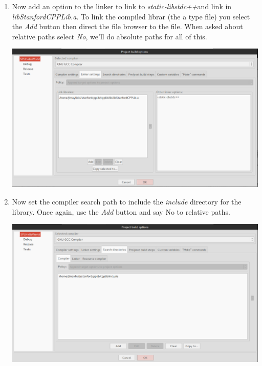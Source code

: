 \documentclass[10pt]{article}
\begin{document}
\begin{enumerate}
\item Now add an option to the linker to link to \textit{static-libstdc++}and link in \textit{libStanfordCPPLib.a}.  To link the compiled librar (the a type file) you select the \textit{Add} button then direct the file browser to the file.  When asked about relative paths select \textit{No}, we'll do absolute paths for all of this.

\vspace{.1in}
\begin{center}
\includegraphics[scale=.35]{scpplib-linker.png}
\end{center}
\vspace{.1in}

\item Now set the compiler search path to include the \textit{include} directory for the library. Once again, use the \textit{Add} button and say No to relative paths.

\vspace{.1in}
\begin{center}
\includegraphics[scale=.35]{scpplib-compilersearch.png}
\end{center}
\vspace{.1in}


\end{enumerate}
\end{document}
